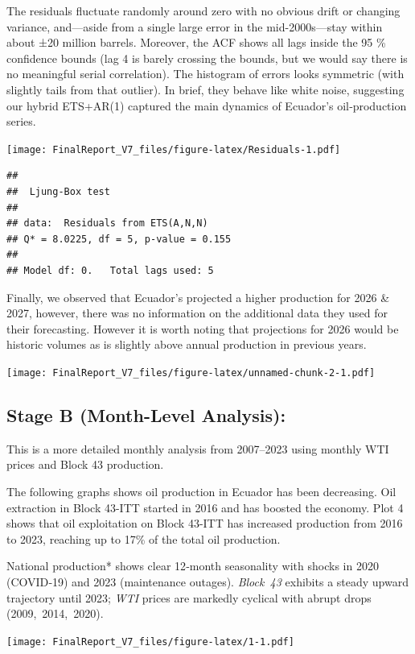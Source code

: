 \documentclass[
]{article}
\begin{document}
The residuals fluctuate randomly around zero with no obvious drift or
changing variance, and---aside from a single large error in the
mid-2000s---stay within about ±20 million barrels. Moreover, the ACF
shows all lags inside the 95 \% confidence bounds (lag 4 is barely
crossing the bounds, but we would say there is no meaningful serial
correlation). The histogram of errors looks symmetric (with slightly
tails from that outlier). In brief, they behave like white noise,
suggesting our hybrid ETS+AR(1) captured the main dynamics of Ecuador's
oil‐production series.

\texttt{[image: FinalReport\_V7\_files/figure-latex/Residuals-1.pdf]}

\begin{verbatim}
## 
##  Ljung-Box test
## 
## data:  Residuals from ETS(A,N,N)
## Q* = 8.0225, df = 5, p-value = 0.155
## 
## Model df: 0.   Total lags used: 5
\end{verbatim}

Finally, we observed that Ecuador's projected a higher production for
2026 \& 2027, however, there was no information on the additional data
they used for their forecasting. However it is worth noting that
projections for 2026 would be historic volumes as is slightly above
annual production in previous years.

\texttt{[image: FinalReport\_V7\_files/figure-latex/unnamed-chunk-2-1.pdf]}

\subsection{Stage B (Month-Level
Analysis):}\label{stage-b-month-level-analysis}

This is a more detailed monthly analysis from 2007--2023 using monthly
WTI prices and Block 43 production.

The following graphs shows oil production in Ecuador has been
decreasing. Oil extraction in Block 43-ITT started in 2016 and has
boosted the economy. Plot 4 shows that oil exploitation on Block 43-ITT
has increased production from 2016 to 2023, reaching up to 17\% of the
total oil production.

National production* shows clear 12‑month seasonality with shocks in
2020 (COVID‑19) and 2023 (maintenance outages). \emph{Block~43} exhibits
a steady upward trajectory until 2023; \emph{WTI} prices are markedly
cyclical with abrupt drops (2009,~2014,~2020).

\texttt{[image: FinalReport\_V7\_files/figure-latex/1-1.pdf]}
\end{document}
